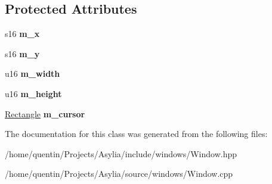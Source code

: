 \subsection*{Protected Attributes}
\begin{DoxyCompactItemize}
\item 
\hypertarget{classWindow_a9c81381f61395db2cd2a29d4bcd73c40}{s16 {\bfseries m\-\_\-x}}\label{classWindow_a9c81381f61395db2cd2a29d4bcd73c40}

\item 
\hypertarget{classWindow_aed13dcbadd684012cb454f0ddf95b938}{s16 {\bfseries m\-\_\-y}}\label{classWindow_aed13dcbadd684012cb454f0ddf95b938}

\item 
\hypertarget{classWindow_a28cc4474674225a826c0b97df1c1fbda}{u16 {\bfseries m\-\_\-width}}\label{classWindow_a28cc4474674225a826c0b97df1c1fbda}

\item 
\hypertarget{classWindow_a0ebb6c7563f270290663b3c79aeffe70}{u16 {\bfseries m\-\_\-height}}\label{classWindow_a0ebb6c7563f270290663b3c79aeffe70}

\item 
\hypertarget{classWindow_a298b2bc9476a79142f5a2aed7a7b526c}{\hyperlink{structRectangle}{Rectangle} {\bfseries m\-\_\-cursor}}\label{classWindow_a298b2bc9476a79142f5a2aed7a7b526c}

\end{DoxyCompactItemize}


The documentation for this class was generated from the following files\-:\begin{DoxyCompactItemize}
\item 
/home/quentin/\-Projects/\-Asylia/include/windows/Window.\-hpp\item 
/home/quentin/\-Projects/\-Asylia/source/windows/Window.\-cpp\end{DoxyCompactItemize}
